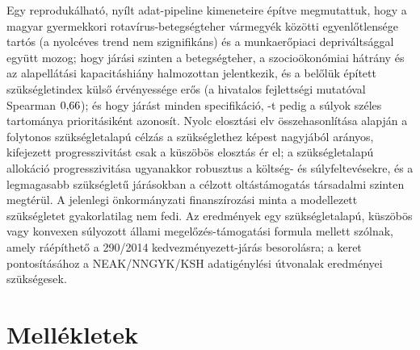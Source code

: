\documentclass[12pt,a4paper]{article}
\begin{document}
Egy reprodukálható, nyílt adat-pipeline kimeneteire építve megmutattuk, hogy
a magyar gyermekkori rotavírus-betegségteher vármegyék közötti
egyenlőtlensége tartós (a nyolcéves trend nem szignifikáns) és a
munkaerőpiaci depriváltsággal együtt mozog; hogy járási szinten a
betegségteher, a szocioökonómiai hátrány és az alapellátási kapacitáshiány
halmozottan jelentkezik, és a belőlük épített szükségletindex külső
érvényessége erős (a hivatalos fejlettségi mutatóval Spearman
$0{,}66$); és hogy \nSpecRobust{} járást minden
specifikáció, \nRobustPriority-t pedig a súlyok széles tartománya
prioritásiként azonosít. Nyolc elosztási elv összehasonlítása alapján a
folytonos szükségletalapú célzás a szükséglethez képest nagyjából arányos,
kifejezett progresszivitást csak a küszöbös elosztás ér el; a szükségletalapú
allokáció progresszivitása ugyanakkor robusztus a költség- és
súlyfeltevésekre, és a legmagasabb szükségletű járásokban a célzott
oltástámogatás társadalmi szinten megtérül. A jelenlegi önkormányzati
finanszírozási minta a modellezett szükségletet gyakorlatilag nem fedi. Az
eredmények egy szükségletalapú, küszöbös vagy konvexen súlyozott állami
megelőzés-támogatási formula mellett szólnak, amely ráépíthető a 290/2014
kedvezményezett-járás besorolásra; a keret pontosításához a NEAK/NNGYK/KSH
adatigénylési útvonalak eredményei szükségesek.


\clearpage




\appendix
\renewcommand{\thesection}{\Alph{section}}
\renewcommand{\thesubsection}{\thesection.\arabic{subsection}}
\section*{Mell\'ekletek}
\setcounter{section}{0}

\end{document}
